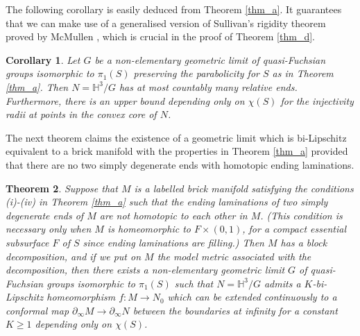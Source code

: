 \documentclass{amsart}
\newtheorem{mtheorem}{Theorem}
\newtheorem{mcorollary}[mtheorem]{Corollary}
\theoremstyle{definition}
\numberwithin{figure}{section}
\numberwithin{equation}{section}
\newcommand{\blackboard}[1]{\ensuremath{\mathbb{#1}}}
\newcommand{\hyperbolic}{\blackboard{H}}
\def\hh{\hyperbolic}
\def\part{\partial}
\begin{document}




The following corollary is easily deduced from Theorem \ref{thm_a}.
It guarantees that we can make use of  a generalised version of Sullivan's rigidity theorem proved by McMullen \cite{Mc}, which is crucial in the proof of Theorem \ref{thm_d}.


\begin{mcorollary}\label{cor_b}
Let $G$ be a non-elementary geometric limit  of quasi-Fuchsian groups isomorphic to $\pi_1(S)$ preserving the parabolicity for $S$ as in Theorem \ref{thm_a}.
Then $N=\hh^3/G$ has at most countably 
many relative ends.
Furthermore, there is an upper bound depending only on $\chi(S)$ for the injectivity radii at points in the convex core of $N$.
\end{mcorollary}

The next theorem claims the existence of a geometric limit which is bi-Lipschitz equivalent to a brick manifold with the properties in Theorem \ref{thm_a} provided that there are no two simply degenerate ends with homotopic ending laminations.


\begin{mtheorem}\label{thm_c}
Suppose that $M$ is a labelled brick manifold satisfying the conditions {\rm (i)}-{\rm (iv)} in Theorem \ref{thm_a}  
 such that 
the ending laminations of  two simply degenerate ends of $M$ are not homotopic to each other in $M$.
(This condition is necessary only when $M$ is homeomorphic to $F \times (0,1)$, for a compact essential subsurface $F$ of $S$ since ending laminations are filling.)
Then $M$ has a block decomposition, and if we put on $M$ the model metric associated with the decomposition, then
there exists a non-elementary geometric limit $G$ of quasi-Fuchsian groups isomorphic to $\pi_1(S)$ 
such that $N=\hh^3/G$ admits a $K$-bi-Lipschitz homeomorphism $f:M\rightarrow N_0$ which can be extended continuously
to a conformal map $\part_\infty M\rightarrow \part_\infty N$ between the boundaries at infinity for a  
 constant $K\geq 1$ depending only on $\chi(S)$.
\end{mtheorem}
\end{document}
